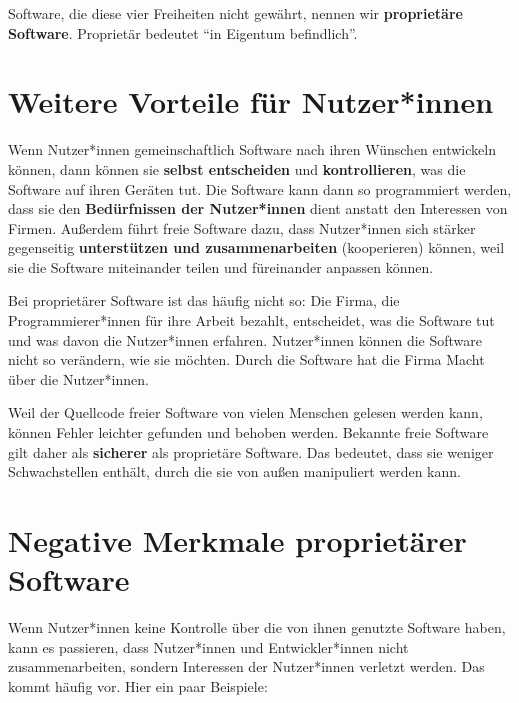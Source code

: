 \documentclass[a5paper,12pt]{scrartcl}
\begin{document}
Software, die diese vier Freiheiten nicht gewährt, nennen wir
\textbf{proprietäre Software}. Proprietär bedeutet "`in Eigentum
befindlich"'.


\section{Weitere Vorteile für Nutzer*innen}

Wenn Nutzer*innen gemeinschaftlich Software nach ihren Wünschen
entwickeln können, dann können sie \textbf{selbst entscheiden} und
\textbf{kontrollieren}, was die Software auf ihren Geräten tut. Die
Software kann dann so programmiert werden, dass sie den
\textbf{Bedürfnissen der Nutzer*innen} dient anstatt den Interessen
von Firmen. Außerdem führt freie Software dazu, dass Nutzer*innen sich
stärker gegenseitig \textbf{unterstützen und zusammenarbeiten}
(kooperieren) können, weil sie die Software miteinander teilen und
füreinander anpassen können.

Bei proprietärer Software ist das häufig nicht so: Die Firma, die
Programmierer*innen für ihre Arbeit bezahlt, entscheidet, was die
Software tut und was davon die Nutzer*innen erfahren. Nutzer*innen
können die Software nicht so verändern, wie sie möchten. Durch die
Software hat die Firma Macht über die Nutzer*innen.

Weil der Quellcode freier Software von vielen Menschen gelesen werden
kann, können Fehler leichter gefunden und behoben werden. Bekannte
freie Software gilt daher als \textbf{sicherer} als proprietäre
Software. Das bedeutet, dass sie weniger Schwachstellen enthält, durch
die sie von außen manipuliert werden kann.


\section{Negative Merkmale proprietärer Software}

Wenn Nutzer*innen keine Kontrolle über die von ihnen genutzte Software
haben, kann es passieren, dass Nutzer*innen und Entwickler*innen nicht
zusammenarbeiten, sondern Interessen der Nutzer*innen verletzt
werden. Das kommt häufig vor. Hier ein paar Beispiele:
\end{document}

